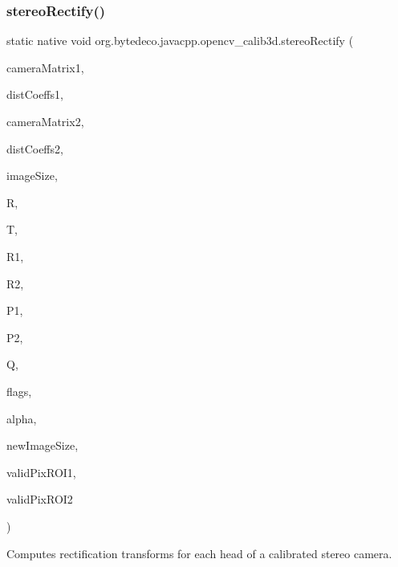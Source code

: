 \subsubsection{\texorpdfstring{stereo\+Rectify()}{stereoRectify()}}
{\footnotesize\ttfamily static native void org.\+bytedeco.\+javacpp.\+opencv\+\_\+calib3d.\+stereo\+Rectify (\begin{DoxyParamCaption}\item[{@By\+Val Mat}]{camera\+Matrix1,  }\item[{@By\+Val Mat}]{dist\+Coeffs1,  }\item[{@By\+Val Mat}]{camera\+Matrix2,  }\item[{@By\+Val Mat}]{dist\+Coeffs2,  }\item[{@By\+Val Size}]{image\+Size,  }\item[{@By\+Val Mat}]{R,  }\item[{@By\+Val Mat}]{T,  }\item[{@By\+Val Mat}]{R1,  }\item[{@By\+Val Mat}]{R2,  }\item[{@By\+Val Mat}]{P1,  }\item[{@By\+Val Mat}]{P2,  }\item[{@By\+Val Mat}]{Q,  }\item[{int}]{flags,  }\item[{double}]{alpha,  }\item[{@By\+Val(null\+Value=\char`\"{}cv\+::\+Size()\char`\"{}) Size}]{new\+Image\+Size,  }\item[{Rect}]{valid\+Pix\+R\+O\+I1,  }\item[{Rect}]{valid\+Pix\+R\+O\+I2 }\end{DoxyParamCaption})\hspace{0.3cm}{\ttfamily [static]}}



Computes rectification transforms for each head of a calibrated stereo camera. 


